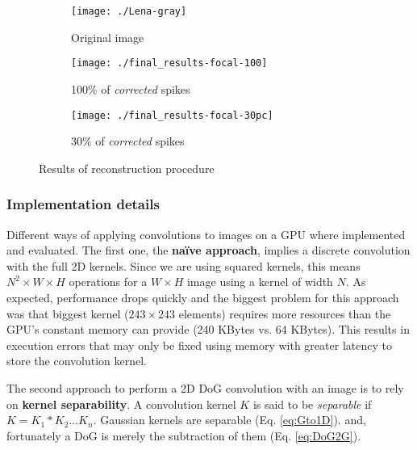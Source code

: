 \begin{figure}[hbt]
  \centering
  \begin{subfigure}[t]{0.3\textwidth}
    \centering
    \captionsetup{justification=centering,margin=0.1cm}
    \texttt{[image: ./Lena-gray]}
    \caption{Original image}
    \label{pic-original-lena}
  \end{subfigure}
  \begin{subfigure}[t]{0.3\textwidth}
    \centering
    \captionsetup{justification=centering,margin=0.1cm}
    \texttt{[image: ./final\_results-focal-100]}
    \caption{100\% of \emph{corrected} spikes}
    \label{pic-100pc-spikes}
  \end{subfigure}
  \begin{subfigure}[t]{0.3\textwidth}
    \centering
    \captionsetup{justification=centering,margin=0.1cm}
    \texttt{[image: ./final\_results-focal-30pc]}
    \caption{30\% of \emph{corrected} spikes}
    \label{pic-30pc-spikes}
  \end{subfigure}
  \caption{Results of reconstruction procedure}
  \label{fig-reconstruction}
  \vspace*{-10pt}
\end{figure}



\subsubsection{Implementation details}
Different ways of applying convolutions to images on a GPU where implemented and evaluated. The first one, the \textbf{naïve approach}, implies a discrete convolution with the full 2D kernels. Since we are using squared kernels, this means $N^2 \times W \times H$ operations for a $W\times H$ image using a kernel of width $N$. As expected, performance drops quickly and the biggest problem for this approach was that biggest kernel ($243\times243$ elements) requires more resources than the GPU's constant memory can provide (240 KBytes vs. 64 KBytes). This results in execution errors that may only be fixed using memory with greater latency to store the convolution kernel. 


The second approach to perform a 2D DoG convolution with an image is to rely on \textbf{kernel separability}. A convolution kernel $K$ is said to be \emph{separable} if $K = K_{1} \ast K_{2} \dots K_{n}$. Gaussian kernels are separable (Eq. \ref{eq:Gto1D}). and, fortunately a DoG is merely the subtraction of them (Eq. \ref{eq:DoG2G}).

